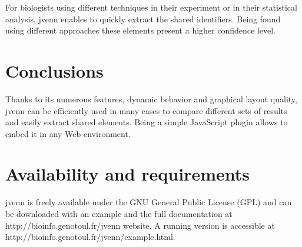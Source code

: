 \documentclass{bmcart}
\begin{document}
For biologists using different techniques in their experiment or in their statistical
analysis, jvenn enables to quickly extract the shared identifiers. Being found 
using different approaches these elements present a higher confidence level.

\section*{Conclusions}

Thanks to its numerous features, dynamic behavior and graphical layout quality, jvenn can be 
efficiently used in many cases to compare different sets of results and easily extract shared 
elements. Being a simple JavaScript plugin allows to embed it in any Web environment.


\section*{Availability and requirements}

jvenn is freely available under the GNU General Public License (GPL) and can be
downloaded with an example and the full documentation at
http://bioinfo.genotoul.fr/jvenn  website. A running version is accessible at
http://bioinfo.genotoul.fr/jvenn/example.html.

\end{document}
